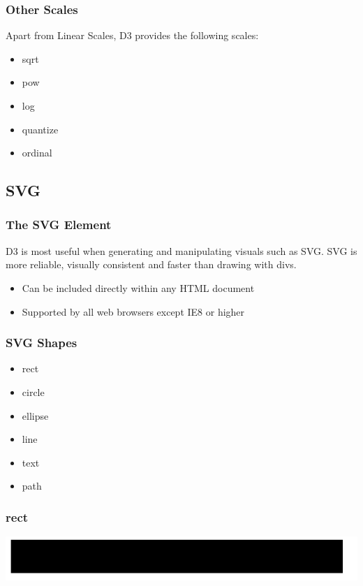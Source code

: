 \documentclass[red]{beamer}
\begin{document}
\begin{frame}
  \frametitle{Other Scales}
  Apart from Linear Scales, D3 provides the following scales:
  \begin{itemize}
  \item<1->sqrt
  \item<2->pow
  \item<3->log
  \item<4->quantize
  \item<5->ordinal
  \end{itemize}
\end{frame}

\subsection{SVG}

\begin{frame}
    \frametitle{The SVG Element}
    D3 is most useful when generating and manipulating visuals such as SVG. SVG is more reliable, visually consistent and faster than drawing with divs. 
    \newline
    \begin{itemize}
    \item<1-> Can be included directly within any HTML document
    \item<2-> Supported by all web browsers except IE8 or higher
    \end{itemize}
\end{frame}

\begin{frame}
  \frametitle{SVG Shapes}
  \begin{itemize}
    \item<1 -> rect
    \item<2 -> circle
    \item<3 -> ellipse
    \item<4 -> line
    \item<5 -> text
    \item<6 -> path
  \end{itemize}
\end{frame}

\begin{frame}
  \frametitle{rect}
  \lstrect
  \includegraphics[width=\textwidth]{img/rect.png}
\end{frame}
\end{document}
